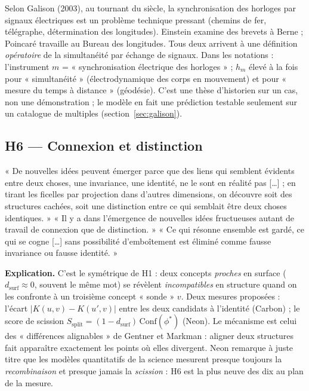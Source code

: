 \documentclass[a4paper,11pt]{article}
\begin{document}
\begin{exemple}
Selon Galison (2003), au tournant du siècle, la synchronisation des horloges par signaux électriques est un problème technique pressant (chemins de fer, télégraphe, détermination des longitudes). Einstein examine des brevets à Berne ; Poincaré travaille au Bureau des longitudes. Tous deux arrivent à une définition \emph{opératoire} de la simultanéité par échange de signaux. Dans les notations : l'instrument $m$ = « synchronisation électrique des horloges » ; $h_m$ élevé à la fois pour « simultanéité » (électrodynamique des corps en mouvement) et pour « mesure du temps à distance » (géodésie). C'est une thèse d'historien sur un cas, non une démonstration ; le modèle en fait une prédiction testable seulement sur un catalogue de multiples (section~\ref{sec:galison}).
\end{exemple}
\subsection{H6 — Connexion et distinction}
\begin{enonce}
« De nouvelles idées peuvent émerger parce que des liens qui semblent évidents entre deux choses, une invariance, une identité, ne le sont en réalité pas […] ; en tirant les ficelles par projection dans d'autres dimensions, on découvre soit des structures cachées, soit une distinction entre ce qui semblait être deux choses identiques. » « Il y a dans l'émergence de nouvelles idées fructueuses autant de travail de connexion que de distinction. » « Ce qui résonne ensemble est gardé, ce qui se cogne […] sans possibilité d'emboîtement est éliminé comme fausse invariance ou fausse identité. »
\end{enonce}

\textbf{Explication.} C'est le symétrique de H1 : deux concepts \emph{proches} en surface ($d_{\text{surf}}\approx 0$, souvent le même mot) se révèlent \emph{incompatibles} en structure quand on les confronte à un troisième concept « sonde » $v$. Deux mesures proposées : l'écart $|K(u,v)-K(u',v)|$ entre les deux candidats à l'identité (Carbon) ; le score de scission $S_{\text{split}}=(1-d_{\text{surf}})\,\mathrm{Conf}(\phi^*)$ (Neon). Le mécanisme est celui des « différences alignables » de Gentner et Markman : aligner deux structures fait apparaître exactement les points où elles divergent. Neon remarque à juste titre que les modèles quantitatifs de la science mesurent presque toujours la \emph{recombinaison} et presque jamais la \emph{scission} : H6 est la plus neuve des dix au plan de la mesure.
\end{document}

